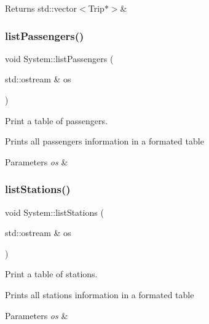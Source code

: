 \begin{DoxyReturn}{Returns}
std\+::vector$<$\+Trip$\ast$$>$\& 
\end{DoxyReturn}
\mbox{\label{classSystem_a23c0b01d0e84fa4665ce85203ce6747b}} 
\subsubsection{\texorpdfstring{list\+Passengers()}{listPassengers()}}
{\footnotesize\ttfamily void System\+::list\+Passengers (\begin{DoxyParamCaption}\item[{std\+::ostream \&}]{os }\end{DoxyParamCaption})}



Print a table of passengers. 

Prints all passengers\textquotesingle{} information in a formated table


\begin{DoxyParams}{Parameters}
{\em os} & \\
\hline
\end{DoxyParams}
\mbox{\label{classSystem_a06041827a7b47ad06eee9d121e42590c}} 
\subsubsection{\texorpdfstring{list\+Stations()}{listStations()}}
{\footnotesize\ttfamily void System\+::list\+Stations (\begin{DoxyParamCaption}\item[{std\+::ostream \&}]{os }\end{DoxyParamCaption})}



Print a table of stations. 

Prints all stations\textquotesingle{} information in a formated table


\begin{DoxyParams}{Parameters}
{\em os} & \\
\hline
\end{DoxyParams}
\mbox{\label{classSystem_a0a6c0d8d1061893151f9b4ee3332ce85}} 
